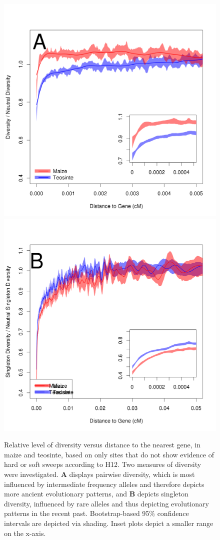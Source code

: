 \begin{figure}
  \includegraphics[width=.5\textwidth]{FigsAndFiles/distanceToGene_Unselected_manuscript.png}
    \includegraphics[width=.5\textwidth]{FigsAndFiles/distanceToGene_unselected_Singletons_manuscript.png}
\caption{ Relative level of diversity versus distance to the nearest gene, in maize and teosinte, based on only sites that do not show evidence of hard or soft sweeps according to H12. Two measures of diversity were investigated. {\bf A} displays pairwise diversity,
which is most influenced by intermediate frequency alleles and therefore depicts more ancient evolutionary patterns, and {\bf B} depicts singleton diversity, influenced by rare alleles and thus depicting evolutionary patterns in the recent past. Bootstrap-based 95\% confidence intervals are depicted via shading. Inset plots depict a smaller range on the x-axis.}
\end{figure}
\clearpage

